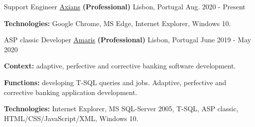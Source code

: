 \begin{cventries}

\vspace{-0.25cm}

  \cventry
    {Support Engineer} %
    {\href{https://www.axians.pt/pt/}{Axians} \textbf{(Professional)}} %
    {Lisbon, Portugal} %
    {Aug. 2020 - Present} %
    {
      \begin{cvitems} %
		\item[] {\textbf{Technologies:} 
		\textcolor{rainbowcolor-olive}{Google Chrome}, 
		\textcolor{rainbowcolor-olive}{MS Edge}, 
		\textcolor{rainbowcolor-olive}{Internet Explorer}, 
		\textcolor{rainbowcolor-orange}{Windows 10}.}			
      \end{cvitems}		
    } 

  \cventry
    {ASP classic Developer} %
    {\href{https://www.amaris.com/}{Amaris} \textbf{(Professional)}} %
    {Lisbon, Portugal} %
    {June 2019 - May 2020} %
    {
      \begin{cvitems} %
		\item[] {\textbf{Context:} adaptive, perfective and corrective banking software development. 
}
		\item[] {\textbf{Functions:} developing T-SQL queries and jobs. Adaptive, perfective and corrective banking application development.}		
		\item[] {\textbf{Technologies:} 
		\textcolor{rainbowcolor-olive}{Internet Explorer}, 
		\textcolor{rainbowcolor-olive}{MS SQL-Server 2005}, 
		\textcolor{rainbowcolor-indigo}{T-SQL}, 
		\textcolor{rainbowcolor-indigo}{ASP classic}, 
		\textcolor{rainbowcolor-indigo}{HTML/CSS/JavaScript/XML}, 
		\textcolor{rainbowcolor-orange}{Windows 10}.}		
      \end{cvitems}
    } 
    

\end{cventries}
